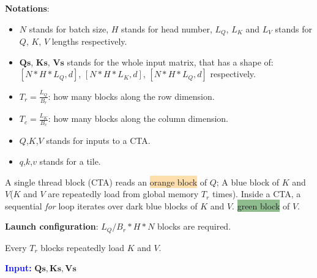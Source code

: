 \textbf{Notations}:

\begin{itemize}
  \item $N$ stands for batch size, $H$ stands for head number, $L_Q$, $L_K$ and $L_V$ stands for $Q$, $K$, $V$ lengths respectively.
  \item $\mathbf{Qs}$,  $\mathbf{Ks}$,  $\mathbf{Vs}$ stands for the whole input matrix, that has a shape of: $[N*H*L_Q, d]$, $[N*H*L_K,d]$, $[N*H*L_Q, d]$ respectively.
  \item $T_r = \frac{L_Q}{B_r}$: how many blocks along the row dimension.
  \item $T_c = \frac{L_K}{B_c}$: how many blocks along the column dimension.
  \item $Q$,$K$,$V$ stands for inputs to a CTA.
  \item $q$,$k$,$v$ stands for a tile.
\end{itemize}


A single thread block (CTA) reads an \colorbox{NavajoWhite}{orange block} of $Q$; A \colorbox{LightSkyBlue1}{blue block} of $K$ and $V$(\textcolor{byzantium}{$K$ and $V$ are repeatedly load from global memory $T_r$ times}).
Inside a CTA, a sequential \textit{for} loop iterates over \colorbox{LightSkyBlue3}{dark blue blocks} of $K$ and $V$.
\colorbox{DarkSeaGreen}{green block} of $V$.

\textbf{Launch configuration}: $L_Q/B_r * H * N$ blocks are required.

Every $T_r$ blocks repeatedly load $K$ and $V$.

\noindent \textcolor{blue}{\textbf{Input:}} $\mathbf{Qs}, \mathbf{Ks}, \mathbf{Vs}$

